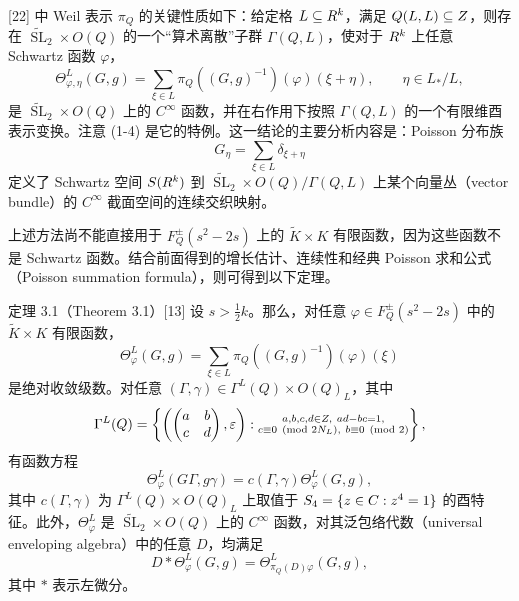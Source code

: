 [22] 中 Weil 表示 $\pi_Q$ 的关键性质如下：给定格 $L\subseteq R^k$，满足 $Q(L,L)\subseteq Z$，则存在 $\widetilde{\operatorname{SL}}_2\times O(Q)$ 的一个“算术离散”子群 $\Gamma(Q,L)$，使对于 $R^k$ 上任意 Schwartz 函数 $\varphi$，
\begin{equation}
 \Theta_{\varphi,\eta}^L(G,g)=\sum_{\xi\in L}
 \pi_Q((G,g)^{-1})(\varphi)(\xi+\eta),\qquad\eta\in L_*/L,\tag{3-1}
\end{equation}
是 $\widetilde{\operatorname{SL}}_2\times O(Q)$ 上的 $C^\infty$ 函数，并在右作用下按照 $\Gamma(Q,L)$ 的一个有限维酉表示变换。注意 (1-4) 是它的特例。这一结论的主要分析内容是：Poisson 分布族
\[
 G_\eta=\sum_{\xi\in L}\delta_{\xi+\eta}
\]
定义了 Schwartz 空间 $S(R^k)$ 到 $\widetilde{\operatorname{SL}}_2\times O(Q)/\Gamma(Q,L)$ 上某个向量丛（vector bundle）的 $C^\infty$ 截面空间的连续交织映射。

上述方法尚不能直接用于 $F_Q^\pm(s^2-2s)$ 上的 $\widetilde K\times K$ 有限函数，因为这些函数不是 Schwartz 函数。结合前面得到的增长估计、连续性和经典 Poisson 求和公式（Poisson summation formula），则可得到以下定理。

\begin{originaltheorem}{定理 3.1（Theorem 3.1）[13]}
设 $s>\tfrac12k$。那么，对任意 $\varphi\in F_Q^\pm(s^2-2s)$ 中的 $\widetilde K\times K$ 有限函数，
\begin{equation}
 \Theta_\varphi^L(G,g)=\sum_{\xi\in L}\pi_Q((G,g)^{-1})(\varphi)(\xi)\tag{3-2}
\end{equation}
是绝对收敛级数。对任意 $(\Gamma,\gamma)\in\Gamma^L(Q)\times O(Q)_L$，其中
\[
 \Gamma^L(Q)=\left\{\left(\begin{pmatrix}a&b\\c&d\end{pmatrix},\varepsilon\right):
 \substack{a,b,c,d\in\Z,\ ad-bc=1,\\c\equiv0\pmod{2N_L},\ b\equiv0\pmod2}\right\},
\]
有函数方程
\begin{equation}
 \Theta_\varphi^L(G\Gamma,g\gamma)=c(\Gamma,\gamma)\Theta_\varphi^L(G,g),\tag{3-3}
\end{equation}
其中 $c(\Gamma,\gamma)$ 为 $\Gamma^L(Q)\times O(Q)_L$ 上取值于 $S_4=\{z\in C:z^4=1\}$ 的酉特征。此外，$\Theta_\varphi^L$ 是 $\widetilde{\operatorname{SL}}_2\times O(Q)$ 上的 $C^\infty$ 函数，对其泛包络代数（universal enveloping algebra）中的任意 $D$，均满足
\[
 D*\Theta_\varphi^L(G,g)=\Theta_{\pi_Q(D)\varphi}^L(G,g),
\]
其中 $*$ 表示左微分。
\end{originaltheorem}

